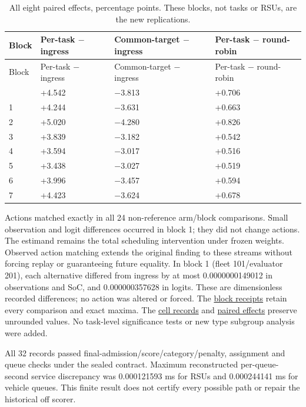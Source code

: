 \documentclass[11pt,a4paper]{article}
\begin{document}
\begingroup
\small
\begin{xltabular}{\textwidth}{@{}YYYY@{}}
\caption{All eight paired effects, percentage points. These blocks, not tasks or RSUs, are the new replications.}\label{tab:E2} \\
\toprule
Block & Per-task \ensuremath{-} ingress & Common-target \ensuremath{-} ingress & Per-task \ensuremath{-} round-robin \\
\midrule\endfirsthead
\toprule
Block & Per-task \ensuremath{-} ingress & Common-target \ensuremath{-} ingress & Per-task \ensuremath{-} round-robin \\
\midrule\endhead
\bottomrule{} & +4.542 & \ensuremath{-}3.813 & +0.706 \\
1 & +4.244 & \ensuremath{-}3.631 & +0.663 \\
2 & +5.020 & \ensuremath{-}4.280 & +0.826 \\
3 & +3.839 & \ensuremath{-}3.182 & +0.542 \\
4 & +3.594 & \ensuremath{-}3.017 & +0.516 \\
5 & +3.438 & \ensuremath{-}3.027 & +0.519 \\
6 & +3.996 & \ensuremath{-}3.457 & +0.594 \\
7 & +4.423 & \ensuremath{-}3.624 & +0.678 \\
\end{xltabular}
\endgroup

Actions matched exactly in all 24 non-reference arm/block comparisons. Small observation and logit differences occurred in block 1; they did not change actions. The estimand remains the total scheduling intervention under frozen weights. Observed action matching extends the original finding to these streams without forcing replay or guaranteeing future equality. In block 1 (fleet 101/evaluator 201), each alternative differed from ingress by at most 0.0000000149012 in observations and SoC, and 0.000000357628 in logits. These are dimensionless recorded differences; no action was altered or forced. The \href{\detokenize{evidence/BLOCK_CONTROLS.json}}{block receipts} retain every comparison and exact maxima. The \href{\detokenize{evidence/CELL_RESULTS.json}}{cell records} and \href{\detokenize{evidence/PAIRED_EFFECTS.csv}}{paired effects} preserve unrounded values. No task-level significance tests or new type subgroup analysis were added.

All 32 records passed final-admission/score/category/penalty, assignment and queue checks under the sealed contract. Maximum reconstructed per-queue-second service discrepancy was 0.000121593 ms for RSUs and 0.000244141 ms for vehicle queues. This finite result does not certify every possible path or repair the historical off scorer.
\end{document}
